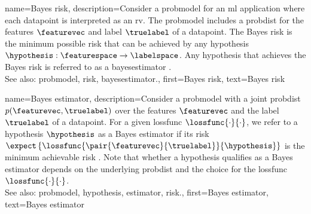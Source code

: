 {name={Bayes risk},
	description={Consider a \gls{probmodel} for an \gls{ml} application where each 
		\gls{datapoint} is interpreted as an \gls{rv}. The \gls{probmodel} includes 
		a \gls{probdist} for the \glspl{feature} $\featurevec$ and \gls{label} $\truelabel$ 
		of a \gls{datapoint}. The Bayes \gls{risk} is the \gls{minimum} 
		possible \gls{risk} that can be achieved by any \gls{hypothesis} $\hypothesis: \featurespace \rightarrow \labelspace$. 
		Any \gls{hypothesis} that achieves the Bayes \gls{risk} is referred to as a 
		\gls{bayesestimator} \cite{LC}.
		\\
		See also: \gls{probmodel}, \gls{risk}, \gls{bayesestimator}.},
	first={Bayes risk},
	text={Bayes risk}
}
	
{name={Bayes estimator},
	description={Consider a \gls{probmodel} with a joint \gls{probdist} 
		$p(\featurevec,\truelabel)$ over the \glspl{feature} $\featurevec$ and the \gls{label} $\truelabel$ 
		of a \gls{datapoint}. For a given \gls{lossfunc} $\lossfunc{\cdot}{\cdot}$, we refer to a \gls{hypothesis} 
		$\hypothesis$ as a Bayes \gls{estimator} if its \gls{risk} 
		$\expect\left\{\lossfunc{\pair{\featurevec}{\truelabel}}{\hypothesis}\right\}$
		is the \gls{minimum} achievable \gls{risk} \cite{LC}. 
		Note that whether a \gls{hypothesis} qualifies as a Bayes \gls{estimator} depends on 
		the underlying \gls{probdist} and the choice for the \gls{lossfunc} $\lossfunc{\cdot}{\cdot}$.
		\\
		See also: \gls{probmodel}, \gls{hypothesis}, \gls{estimator}, \gls{risk}.},
	first={Bayes estimator},
	text={Bayes estimator}
}

